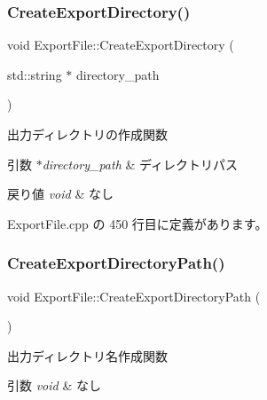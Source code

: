 \subsubsection{\texorpdfstring{Create\+Export\+Directory()}{CreateExportDirectory()}}
{\footnotesize\ttfamily void Export\+File\+::\+Create\+Export\+Directory (\begin{DoxyParamCaption}\item[{std\+::string $\ast$}]{directory\+\_\+path }\end{DoxyParamCaption})\hspace{0.3cm}{\ttfamily [private]}}



出力ディレクトリの作成関数 


\begin{DoxyParams}{引数}
{\em $\ast$directory\+\_\+path} & ディレクトリパス \\
\hline
\end{DoxyParams}

\begin{DoxyRetVals}{戻り値}
{\em void} & なし \\
\hline
\end{DoxyRetVals}


 Export\+File.\+cpp の 450 行目に定義があります。

\mbox{\label{class_export_file_af2c0b760712fc2806e030e4d30fc9599}} 
\subsubsection{\texorpdfstring{Create\+Export\+Directory\+Path()}{CreateExportDirectoryPath()}}
{\footnotesize\ttfamily void Export\+File\+::\+Create\+Export\+Directory\+Path (\begin{DoxyParamCaption}{ }\end{DoxyParamCaption})\hspace{0.3cm}{\ttfamily [private]}}



出力ディレクトリ名作成関数 


\begin{DoxyParams}{引数}
{\em void} & なし \\
\hline
\end{DoxyParams}

